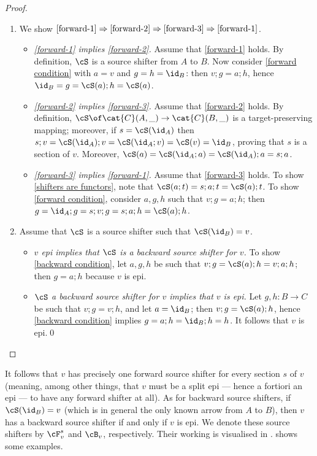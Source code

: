 \begin{fullorname}
\begin{proof}
\begin{enumerate}[topsep=\smallskipamount]
\item
We show $\ref{forward-1} \Rightarrow \ref{forward-2} \Rightarrow \ref{forward-3} \Rightarrow \ref{forward-1}$.
\begin{itemize}
\item \emph{\ref{forward-1} implies \ref{forward-2}.}
%
Assume that \ref{forward-1} holds. By definition, $\cS$ is a source shifter from $A$ to $B$. Now consider \eqref{forward condition} with $a=v$ and $g=h=\id_B$: then $v;g=a;h$, hence $\id_B=g = \cS(a);h=\cS(a)$.

\item \emph{\ref{forward-2} implies \ref{forward-3}.}
%
Assume that \ref{forward-2} holds. By definition, $\cS \of \cat{C}(A,\_) \to \cat{C}(B, \_)$  is a target-preserving mapping; moreover, if $s=\cS(\id_A)$ then $s;v=\cS(\id_A);v=\cS(\id_A;v)=\cS(v)=\id_B$, proving that $s$ is a section of $v$. Moreover, $\cS(a)=\cS(\id_A;a)=\cS(\id_A);a=s;a$.

\item \emph{\ref{forward-3} implies \ref{forward-1}.}
%
Assume that \ref{forward-3} holds. To show \eqref{shifters are functors}, note that $\cS(a;t)=s;a;t=\cS(a);t$. To show \eqref{forward condition}, consider $a,g,h$ such that $v;g=a;h$; then $g=\id_A;g=s;v;g=s;a;h = \cS(a);h$.
\end{itemize}

\item Assume that $\cS$ is a source shifter such that $\cS(\id_B)=v$.
\begin{itemize}
\item \emph{$v$ epi implies that $\cS$ is a backward source shifter for $v$.} To show \eqref{backward condition}, let $a,g,h$ be such that $v;g=\cS(a);h=v;a;h$; then $g=a;h$ because $v$ is epi.

\item \emph{$\cS$ a backward source shifter for $v$ implies that $v$ is epi.} Let $g,h:B\to C$ be such that $v;g=v;h$, and let $a=\id_B$; then $v;g=\cS(a);h$, hence \eqref{backward condition} implies $g=a;h=\id_B;h=h$. It follows that $v$ is epi.\qed
\end{itemize}
\end{enumerate}
\end{proof}
\end{fullorname}
%
It follows that $v$ has precisely one forward source shifter for every section $s$ of $v$ (meaning, among other things, that $v$ must be a split epi --- hence a fortiori an epi --- to have any forward shifter at all). As for backward source shifters, if $\cS(\id_B)=v$ (which is in general the only known arrow from $A$ to $B$), then $v$ has a backward source shifter if and only if $v$ is epi. We denote these source shifters by $\cF_v^s$ and $\cB_v$, respectively. Their working is visualised in .  shows some examples.

